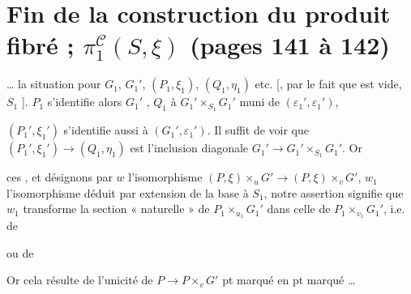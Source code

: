 \documentclass[11pt,a4paper]{article}
\begin{document}
\section*{Fin de la construction du produit fibré ; $\pi_1^{\mathcal{C}}(S,\xi)$ (pages 141 à 142)}



\ldots{} la situation pour $G_1$, $G_1'$, $(P_1,\xi_1)$, $(Q_1,\eta_1)$ etc.
[, \ill{} par le fait que  est vide,
$S_1$ \ill{}  \ill{}]. $P_1$ s'identifie alors
 $G_1'$ , $Q_1$ à
 $G_1' \times_{S_1} G_1'$ muni de
$(\varepsilon_1', \varepsilon_1')$, \struck{\ill{}} 

$(P_1', \xi_1')$ s'identifie aussi à $(G_1', \varepsilon_1')$. Il suffit
de voir que $(P_1', \xi_1') \to (Q_1, \eta_1)$ est
l'inclusion diagonale $G_1' \to G_1' \times_{S_1} G_1'$. Or

\struck{\ill{}} \ill{} ces , et désignons par
$w$ l'isomorphisme $(P,\xi) \times_u G' \to (P,\xi) \times_v G'$,
$w_1$ l'isomorphisme déduit par extension de la base
à $S_1$, notre assertion signifie que $w_1$ transforme
la section « naturelle » de
$P_1 \times_{u_1} G_1'$ dans celle de $P_1 \times_{v_1} G_1'$, i.e.  de


ou  de


Or cela résulte de l'unicité de $P \to P \times_v G'$
 \struck{\ill{}} pt marqué en pt marqué \ldots
\end{document}

